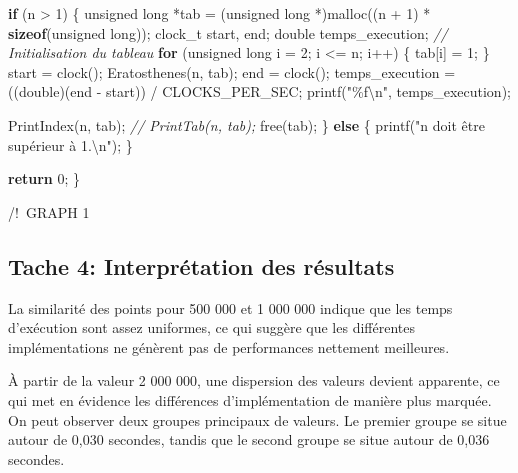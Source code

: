 \documentclass[
]{article}
\newenvironment{Shaded}{}{}
\newcommand{\CommentTok}[1]{\textcolor[rgb]{0.38,0.63,0.69}{\textit{#1}}}
\newcommand{\ControlFlowTok}[1]{\textcolor[rgb]{0.00,0.44,0.13}{\textbf{#1}}}
\newcommand{\DataTypeTok}[1]{\textcolor[rgb]{0.56,0.13,0.00}{#1}}
\newcommand{\DecValTok}[1]{\textcolor[rgb]{0.25,0.63,0.44}{#1}}
\newcommand{\KeywordTok}[1]{\textcolor[rgb]{0.00,0.44,0.13}{\textbf{#1}}}
\newcommand{\NormalTok}[1]{#1}
\newcommand{\SpecialCharTok}[1]{\textcolor[rgb]{0.25,0.44,0.63}{#1}}
\newcommand{\StringTok}[1]{\textcolor[rgb]{0.25,0.44,0.63}{#1}}
\begin{document}
\begin{Shaded}
\begin{Highlighting}[]
    \ControlFlowTok{if}\NormalTok{ (n \textgreater{} }\DecValTok{1}\NormalTok{)}
\NormalTok{    \{}
        \DataTypeTok{unsigned} \DataTypeTok{long}\NormalTok{ *tab = (}\DataTypeTok{unsigned} \DataTypeTok{long}\NormalTok{ *)malloc((n + }\DecValTok{1}\NormalTok{) * }\KeywordTok{sizeof}\NormalTok{(}\DataTypeTok{unsigned} \DataTypeTok{long}\NormalTok{));}
\NormalTok{        clock\_t start, end;}
        \DataTypeTok{double}\NormalTok{ temps\_execution;}
        \CommentTok{// Initialisation du tableau}
        \ControlFlowTok{for}\NormalTok{ (}\DataTypeTok{unsigned} \DataTypeTok{long}\NormalTok{ i = }\DecValTok{2}\NormalTok{; i \textless{}= n; i++)}
\NormalTok{        \{}
\NormalTok{            tab[i] = }\DecValTok{1}\NormalTok{;}
\NormalTok{        \}}
\NormalTok{        start = clock();}
\NormalTok{        Eratosthenes(n, tab);}
\NormalTok{        end = clock();}
\NormalTok{        temps\_execution = ((}\DataTypeTok{double}\NormalTok{)(end {-} start)) / CLOCKS\_PER\_SEC;}
\NormalTok{        printf(}\StringTok{"\%f}\SpecialCharTok{\textbackslash{}n}\StringTok{"}\NormalTok{, temps\_execution);}

\NormalTok{        PrintIndex(n, tab);}
        \CommentTok{// PrintTab(n, tab);}
\NormalTok{        free(tab);}
\NormalTok{    \}}
    \ControlFlowTok{else}
\NormalTok{    \{}
\NormalTok{        printf(}\StringTok{"n doit être supérieur à 1.}\SpecialCharTok{\textbackslash{}n}\StringTok{"}\NormalTok{);}
\NormalTok{    \}}

    \ControlFlowTok{return} \DecValTok{0}\NormalTok{;}
\NormalTok{\}}
\end{Highlighting}
\end{Shaded}

\pagebreak

/!~GRAPH 1\\
\pagebreak 

\hypertarget{tache-4-interpruxe9tation-des-ruxe9sultats}{%
\subsection{Tache 4: Interprétation des
résultats}\label{tache-4-interpruxe9tation-des-ruxe9sultats}}

La similarité des points pour 500 000 et 1 000 000 indique que les temps
d'exécution sont assez uniformes, ce qui suggère que les différentes
implémentations ne génèrent pas de performances nettement meilleures.

À partir de la valeur 2 000 000, une dispersion des valeurs devient
apparente, ce qui met en évidence les différences d'implémentation de
manière plus marquée. On peut observer deux groupes principaux de
valeurs. Le premier groupe se situe autour de 0,030 secondes, tandis que
le second groupe se situe autour de 0,036 secondes.
\end{document}
